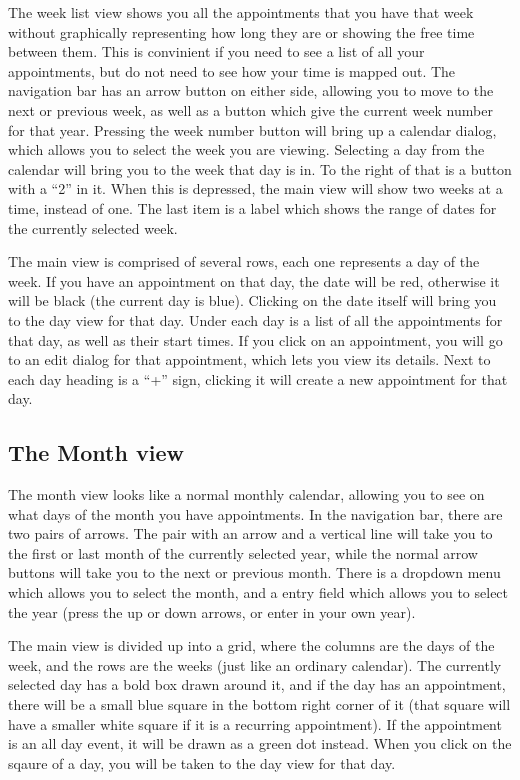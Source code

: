 \documentclass[12pt,letterpaper,oneside, openany]{book} \usepackage[latin1] {inputenc}
\begin{document}
The week list view shows you all the appointments that you have that week without graphically representing how long they are or showing the free time between them. This is convinient if you need to see a list of all your appointments, but do not need to see how your time is mapped out. The navigation bar has an arrow button on either side, allowing you to move to the next or previous week, as well as a button which give the current week number for that year. Pressing the week number button will bring up a calendar dialog, which allows you to select the week you are viewing. Selecting a day from the calendar will bring you to the week that day is in. To the right of that is a button with a ``2'' in it. When this is depressed, the main view will show two weeks at a time, instead of one. The last item is a label which shows the range of dates for the currently selected week. 

The main view is comprised of several rows, each one represents a day of the week. If you have an appointment on that day, the date will be red, otherwise it will be black (the current day is blue). Clicking on the date itself will bring you to the day view for that day. Under each day is a list of all the appointments for that day, as well as their start times. If you click on an appointment, you will go to an edit dialog for that appointment, which lets you view its details. Next to each day heading is a ``+'' sign, clicking it will create a new appointment for that day. 

\subsection{The Month view}

The month view looks like a normal monthly calendar, allowing you to see on what days of the month you have appointments. In the navigation bar, there are two pairs of arrows. The pair with an arrow and a vertical line will take you to the first or last month of the currently selected year, while the normal arrow buttons will take you to the next or previous month. There is a dropdown menu which allows you to select the month, and a entry field which allows you to select the year (press the up or down arrows, or enter in your own year). 

The main view is divided up into a grid, where the columns are the days of the week, and the rows are the weeks (just like an ordinary calendar). The currently selected day has a bold box drawn around it, and if the day has an appointment, there will be a small blue square in the bottom right corner of it (that square will have a smaller white square if it is a recurring appointment). If the appointment is an all day event, it will be drawn as a green dot instead. When you click on the sqaure of a day, you will be taken to the day view for that day. 
\end{document}
